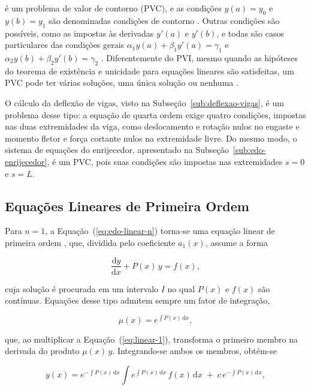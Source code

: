 \documentclass[arial,centeredequations,english,brazilian,oneside,section=TITLE]{ifes8}
\begin{document}
é um problema de valor de contorno (PVC), e as condições $y(a) = y_0$ e $y(b) = y_1$
são denominadas condições de contorno \cite{Zill2001v1}. Outras condições são
possíveis, como as impostas às derivadas $y'(a)$ e $y'(b)$, e todas são casos
particulares das condições gerais $\alpha_1 y(a) + \beta_1 y'(a) = \gamma_1$ e
$\alpha_2 y(b) + \beta_2 y'(b) = \gamma_2$ \cite{Zill2001v1}. Diferentemente
do PVI, mesmo quando as hipóteses do teorema de existência e unicidade para equações
lineares são satisfeitas, um PVC pode ter várias soluções, uma única solução ou nenhuma
\cite{Zill2001v1}.
 
O cálculo da deflexão de vigas, visto na Subseção~\ref{sub:deflexao-vigas}, é um
problema desse tipo: a equação de quarta ordem exige quatro condições, impostas nas duas
extremidades da viga, como deslocamento e rotação nulos no engaste e momento fletor e
força cortante nulos na extremidade livre. Do mesmo modo, o sistema de equações do
enrijecedor, apresentado na Subseção~\ref{sub:edo-enrijecedor}, é um PVC, pois suas
condições são impostas nas extremidades $s = 0$ e $s = L$.
 
\subsection{Equações Lineares de Primeira Ordem}
\label{sub:edo-linear-1}
 
Para $n = 1$, a Equação~(\ref{eq:edo-linear-n}) torna-se uma equação linear de primeira
ordem \cite{Zill2001v1}, que, dividida pelo coeficiente $a_1(x)$, assume a forma

\begin{equation}
  \label{eq:linear-1}
  \frac{\mathrm{d}y}{\mathrm{d}x} + P(x)\,y = f(x),
\end{equation}

cuja solução é procurada em um intervalo $I$ no qual $P(x)$ e $f(x)$ são contínuas.
Equações desse tipo admitem sempre um fator de integração,

\begin{equation}
  \label{eq:fator-integracao}
  \mu(x) = e^{\int P(x)\,\mathrm{d}x},
\end{equation}

que, ao multiplicar a Equação~(\ref{eq:linear-1}), transforma o primeiro membro na
derivada do produto $\mu(x)\,y$. Integrando-se ambos os membros, obtém-se
\cite{Zill2001v1}

\begin{equation}
  \label{eq:solucao-linear-1}
  y(x) = e^{-\int P(x)\,\mathrm{d}x} \int e^{\int P(x)\,\mathrm{d}x}\, f(x)\,\mathrm{d}x
  \;+\; c\,e^{-\int P(x)\,\mathrm{d}x},
\end{equation}
\end{document}
